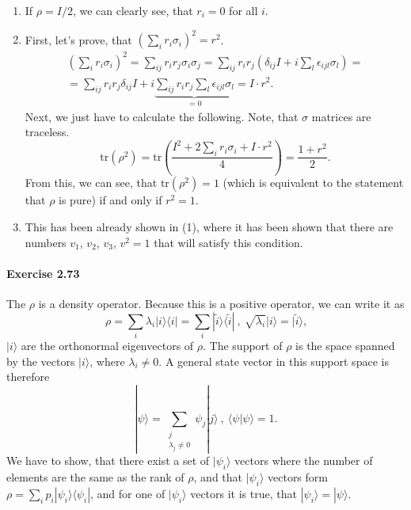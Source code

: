 \documentclass[a4paper,12pt]{article}
\newcommand{\exercise}[1]{\paragraph{Exercise #1}}
\newcommand{\la}{\langle}
\newcommand{\ra}{\rangle}
\begin{document}
\begin{enumerate}[label=(\arabic*)]
        \item If $\rho = I/2$, we can clearly see, that $r_i = 0$ for all $i$.

        \item First, let's prove, that $\left( \sum_i r_i \sigma_i \right)^2 = r^2$.
            \begin{gather}
                \nonumber
                \left( \sum_i r_i \sigma_i \right)^2 = \sum_{ij} r_i r_j \sigma_i \sigma_j = \sum_{ij} r_i r_j \left( \delta_{ij} I + i \sum_l \epsilon_{ijl} \sigma_l \right) =\\
                = \sum_{ij} r_i r_j \delta_{ij} I + i \underbrace{\sum_{ij} r_i r_j \sum_l \epsilon_{ijl} \sigma_l}_{ = 0} = I \cdot r^2 \textrm{.}
            \end{gather}
            Next, we just have to calculate the following. Note, that $\sigma$ matrices are traceless.
            \begin{equation}
                \textrm{tr}(\rho^2) = \textrm{tr}\left(\frac{I^2 + 2 \sum_i r_i \sigma_i + I \cdot r^2}{4} \right) = \frac{1 + r^2}{2} \textrm{.}
            \end{equation}
            From this, we can see, that $\textrm{tr}(\rho^2) = 1$ (which is equivalent to the statement that $\rho$ is pure) if and only if $r^2 = 1$.

        \item This has been already shown in (1), where it has been shown that there are numbers $v_1$, $v_2$, $v_3$, $v^2 = 1$ that will satisfy this condition.

    \end{enumerate}

    \exercise{2.73} The $\rho$ is a density operator. Because this is a positive operator, we can write it as
    \begin{equation}
        \rho = \sum_i \lambda_i | i \ra \la i | = \sum_i | \tilde{i} \ra \la \tilde{i} | \ , \  \sqrt{\lambda_i} | i \ra = | \tilde{i} \ra \textrm{,}
    \end{equation}
    $| i \ra$ are the orthonormal eigenvectors of $\rho$. The support of $\rho$ is the space spanned by the vectors $|i \ra$, where $\lambda_i \neq 0$. A general state vector in this support space is therefore
    \begin{equation}
        | \psi \ra = \sum_{\substack{j\\ \lambda_j \neq 0}} \psi_j | j \ra\ , \ \la \psi | \psi \ra = 1 \textrm{.}
    \end{equation}
    We have to show, that there exist a set of $|\psi_i \ra$ vectors where the number of elements are the same as the rank of $\rho$, and that $| \psi_i \ra$ vectors form $\rho = \sum_i p_i | \psi_i \ra \la \psi_i |$, and for one of $| \psi_i \ra$ vectors it is true, that $| \psi_i \ra = | \psi \ra$.
\end{document}
